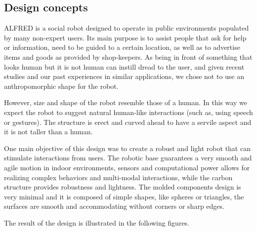 \subsection{Design concepts}

ALFRED is a social robot designed to operate in public environments populated by many non-expert users.
Its main purpose is to assist people that ask for help or information, need to be guided to a certain
location, as well as to advertise items and goods as provided by shop-keepers.
As being in front of something that looks human but it is not human can instill dread to the user, and given recent studies and our past experiences in similar applications, we chose not to use an anthropomorphic shape for the robot.

However, size and shape of the robot resemble those of a human. In this way we expect the robot to suggest
natural human-like interactions (such as, using speech or gestures). The structure is erect and curved ahead to
have a servile aspect and it is not taller than a human.

One main objective of this design was to create a robust and light robot that can stimulate interactions from
users.
The robotic base guarantees a very smooth and agile motion in indoor environments, sensors and
computational power allows for realizing complex behaviors and multi-modal interactions, while the carbon
structure provides robustness and lightness.
The molded components design is very minimal and it is composed of simple shapes, like spheres or
triangles, the surfaces are smooth and accommodating without corners or sharp edges.

The result of the design is illustrated in the following figures.

